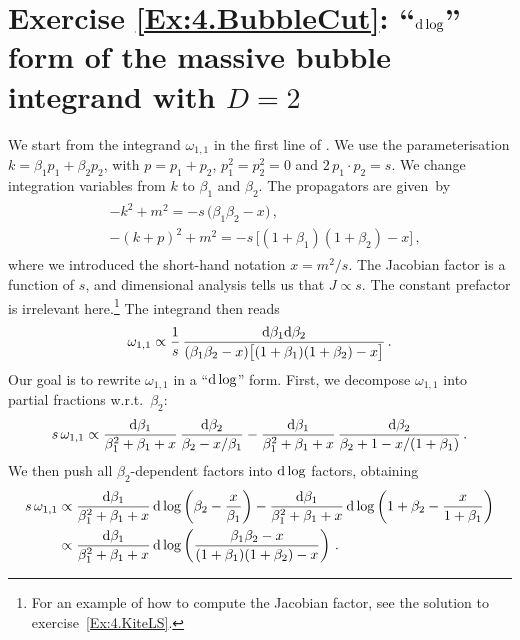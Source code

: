 \section*{Exercise \ref{Ex:4.BubbleCut}: ``$\mathrm{d} \log$'' form of the massive bubble integrand with $D=2$}
\label{Sol:4.BubbleCut}
%
We start from the integrand $\omega_{1,1}$ in the first line of . We use the parameterisation $k = \beta_1 p_1 + \beta_2 p_2$, with $p=p_1+p_2$, $p_1^2=p_2^2=0$ and $2 \, p_1 \cdot p_2 = s$.
We change integration variables from $k$ to $\beta_1$ and $\beta_2$.
The propagators are given~by
\begin{align} \label{eq:prop_beta} \begin{aligned}
& -k^2 + m^2 = -s \, \bigl( \beta_1 \beta_2 - x \bigr) \,, \\
& -(k+p)^2 + m^2 = -s \, \bigl[ (1+\beta_1)(1+\beta_2) - x \bigr] \,,
\end{aligned} \end{align}
where we introduced the short-hand notation $x=m^2/s$.
The Jacobian factor is a function of $s$, and dimensional analysis tells us that $J\propto s$. The constant prefactor is irrelevant here.\footnote{For an example of how to compute the Jacobian factor, see the solution to exercise~\ref{Ex:4.KiteLS}.}
The integrand then reads
\begin{align} \label{eq:ometa11beta}
\omega_{1,1} \propto \frac{1}{s} \, \frac{\mathrm{d} \beta_1 \mathrm{d} \beta_2}{(\beta_1 \beta_2 - x) \bigl[ (1+\beta_1)(1+\beta_2)-x\bigr]} \,.
\end{align}
Our goal is to rewrite $\omega_{1,1}$ in a ``$\mathrm{d} \log$'' form. First, we decompose $\omega_{1,1}$ into partial fractions w.r.t.~$\beta_2$:
\begin{align}
s \, \omega_{1,1} \propto \frac{\mathrm{d} \beta_1}{\beta_1^2 + \beta_1 + x} \, \frac{\mathrm{d} \beta_2}{\beta_2 - x/\beta_1} - 
  \frac{\mathrm{d} \beta_1}{\beta_1^2 + \beta_1 + x} \, \frac{\mathrm{d} \beta_2}{\beta_2 + 1 - x/(1+\beta_1)} \,.
\end{align}
We then push all $\beta_2$-dependent factors into $\mathrm{d} \log$ factors, obtaining
\begin{align} \begin{aligned}
s \, \omega_{1,1} & \propto \frac{\mathrm{d} \beta_1}{\beta_1^2 + \beta_1 + x} \, \mathrm{d} \log\left(\beta_2 - \frac{x}{\beta_1} \right) - 
  \frac{\mathrm{d} \beta_1}{\beta_1^2 + \beta_1 + x} \, \mathrm{d} \log\left(1+\beta_2 - \frac{x}{1+\beta_1} \right)  \\
 & \propto  \frac{\mathrm{d} \beta_1}{\beta_1^2 + \beta_1 + x} \, \mathrm{d} \log \left( \frac{\beta_1 \beta_2 - x}{(1 + \beta_1)(1 + \beta_2) - x} \right) \,.
\end{aligned} \end{align}
